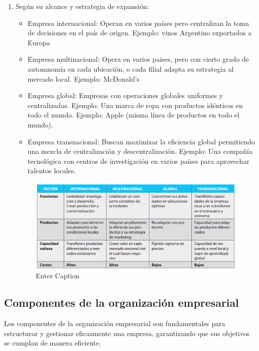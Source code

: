 \documentclass[a4paper,oneside,11pt]{article}
\begin{document}
\begin{enumerate}
    \item  Según su alcance y estrategia de expansión:
    \begin{itemize}
        \item Empresa internacional: Operan en varios países pero centralizan la toma de decisiones en el país de origen. Ejemplo: vinos Argentino exportados a Europa
        \item Empresa multinacional: Opera en varios paises, pero con cierto grado de automnomía en cada ubicación, o cada filial adapta su estrategia al mercado local. Ejemplo: McDonald's
        \item Empresa global: Empresas con operaciones globales uniformes y centralizadas. Ejemplo: Una marca de ropa con productos idénticos en todo el mundo. Ejemplo: Apple (misma línea de productos en todo el mundo).
        \item Empresa transnacional: Buscan maximizar la eficiencia global permitiendo una mezcla de centralización y descentralización. Ejemplo: Una compañía tecnológica con centros de investigación en varios países para aprovechar talentos locales.
    \end{itemize}

    \begin{figure} [ht!]
        \centering
        \includegraphics[scale=0.8]{cuadro alcance.png}
        \caption{Enter Caption}
        \label{fig:alcance}
    \end{figure}
\end{enumerate}


\subsection{Componentes de la organización empresarial}

Los componentes de la organización empresarial son fundamentales para estructurar y gestionar eficazmente una empresa, garantizando que sus objetivos se cumplan de manera eficiente.
\end{document}
